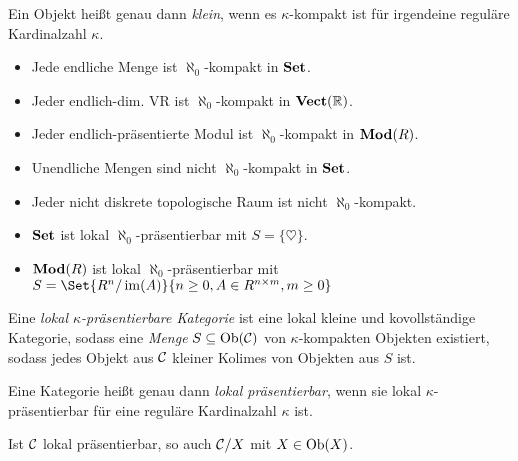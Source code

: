 \documentclass{cheat-sheet}
\begin{document}
\begin{defn}
  Ein Objekt heißt genau dann \emph{klein}, wenn es $\kappa$-kompakt ist für irgendeine reguläre Kardinalzahl $\kappa$.
\end{defn}

\iffalse
\begin{idee}
  Sei $X$ eine endliche Menge. Sei $X \subset \cup_{i \in \N} T_i$, $T_i \subseteq T_{i+1}$. Dann liegt $X$ schon vollständig in einem der $T_i$.
\end{idee}
\fi

\begin{bspe}
  \begin{itemize}
    \item Jede endliche Menge ist $\aleph_0$-kompakt in $\mathbf{Set}$.
    \item Jeder endlich-dim. VR ist $\aleph_0$-kompakt in $\mathbf{Vect}(\mathbb{R})$.
    \item Jeder endlich-präsentierte Modul ist $\aleph_0$-kompakt in $\mathbf{Mod}(R)$.
    \item Unendliche Mengen sind nicht $\aleph_0$-kompakt in $\mathbf{Set}$.
    \item Jeder nicht diskrete topologische Raum ist nicht $\aleph_0$-kompakt.
    \item $\mathbf{Set}$ ist lokal $\aleph_0$-präsentierbar mit $S = \{ \heartsuit \}$.
    \item $\mathbf{Mod}(R)$ ist lokal $\aleph_0$-präsentierbar mit $S = \Set{R^n/\im(A)}{n \geq 0, A \in R^{n \times m}, m \geq 0}$
  \end{itemize}
\end{bspe}

\begin{defn}
  Eine \emph{lokal $\kappa$-präsentierbare Kategorie} ist eine lokal kleine und kovollständige Kategorie, sodass eine {\em Menge} $S \subseteq \operatorname{Ob}(\mathcal{C})$ von $\kappa$-kompakten Objekten existiert, sodass jedes Objekt aus $\mathcal{C}$ kleiner Kolimes von Objekten aus $S$ ist.
\end{defn}


\begin{defn}
  Eine Kategorie heißt genau dann \emph{lokal präsentierbar}, wenn sie lokal $\kappa$-präsentierbar für eine reguläre Kardinalzahl $\kappa$ ist.
\end{defn}

\begin{lem}
  Ist $\mathcal{C}$ lokal präsentierbar, so auch $\mathcal{C}/X$ mit $X \in \operatorname{Ob}(X)$.
\end{lem}
\end{document}
